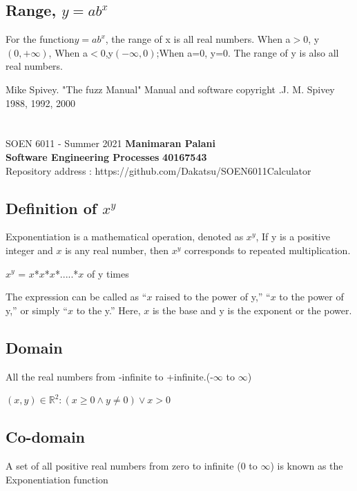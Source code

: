 \documentclass[letterpaper, 11pt]{report}
\begin{document}
\subsection*{ Range,  \(y=ab^x\) } 
For the function\(y=ab^x\), the range of x is all real numbers. When a\(>\)0, y\in\((0,+\infty)\), When a\(<\)0,y\in\((-\infty,0)\);When a=0, y=0. The range of y is also all real numbers.
 
 \begin{thebibliography}{}
 
Mike Spivey. "The fuzz Manual" Manual and software copyright .J. M. Spivey 1988, 1992, 2000


\end{thebibliography}  

\pagebreak
\newcommand{\R}{\mathbb{R}}
\renewcommand{\labelitemi}{$\star$}
\section*{}
\normalsize {SOEN 6011 - Summer 2021} \hfill \textbf{Manimaran Palani} \\
\textbf{ Software Engineering Processes}  \hfill \textbf{40167543} \\
\hfill Repository address : https://github.com/Dakatsu/SOEN6011Calculator
\subsection*{Definition of \(x^y\)}
\cite{mathInsight} Exponentiation is a mathematical operation, denoted as \(x^y\), If y is a positive integer and \(x\) is any real number, then \(x^y\) corresponds to repeated multiplication.
 \begin{center} \(x^y\) = \(x\)*\(x\)*\(x\)*.....*\(x\) of y times \end{center}
The expression can be called as “\(x\) raised to the power of y,” “\(x\) to the power of y,” or simply “\(x\) to the y.” Here, \(x\) is the base and y is the exponent or the power.
\subsection*{Domain}
\cite{mathbits} All the real numbers from -infinite to +infinite.(-\(\infty\) to \(\infty\))
 \begin{center} $(x,y) \in \R^2 : (x \geq 0 \land y \neq 0) \lor x>0$ \end{center}
\subsection*{Co-domain}
A set of all positive real numbers from zero to infinite (0 to \(\infty\)) is known as the Exponentiation function
\end{document}

